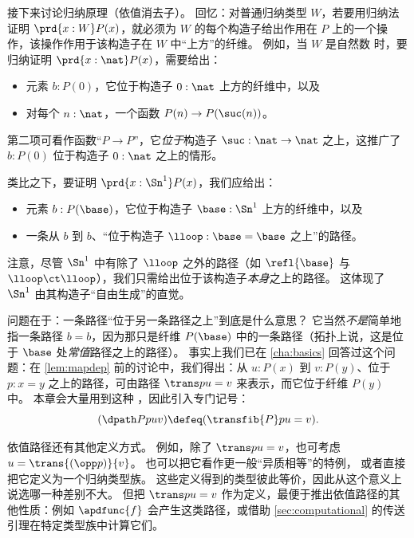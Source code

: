 %
%
接下来讨论归纳原理（依值消去子）。
回忆：对普通归纳类型 $W$，若要用归纳法证明 $\prd{x:W} P(x)$，就必须为 $W$ 的每个构造子给出作用在 $P$ 上的一个操作，该操作作用于该构造子在 $W$ 中“上方”的纤维。
例如，当 $W$ 是自然数 \nat 时，要归纳证明 $\prd{x:\nat} P(x)$，需要给出：
\begin{itemize}
\item 元素 $b:P(0)$，它位于构造子 $0:\nat$ 上方的纤维中，以及
\item 对每个 $n:\nat$，一个函数 $P(n) \to P(\suc(n))$。
\end{itemize}
第二项可看作函数“$P\to P$”，它\emph{位于}构造子 $\suc:\nat\to\nat$ 之上，这推广了 $b:P(0)$ 位于构造子 $0:\nat$ 之上的情形。

类比之下，要证明 $\prd{x:\Sn^1} P(x)$，我们应给出：
\begin{itemize}
\item 元素 $b:P(\base)$，它位于构造子 $\base:\Sn^1$ 上方的纤维中，以及
\item 一条从 $b$ 到 $b$、“位于构造子 $\lloop:\base=\base$ 之上”的路径。
\end{itemize}
注意，尽管 $\Sn^1$ 中有除了 $\lloop$ 之外的路径（如 $\refl{\base}$ 与 $\lloop\ct\lloop$），我们只需给出位于该构造子\emph{本身}之上的路径。
这体现了 $\Sn^1$ 由其构造子“自由生成”的直觉。

问题在于：一条路径“位于另一条路径之上”到底是什么意思？
它当然\emph{不是}简单地指一条路径 $b=b$，因为那只是纤维 $P(\base)$ 中的一条路径（拓扑上说，这是位于 $\base$ 处\emph{常值}路径之上的路径）。
事实上我们已在 \cref{cha:basics} 回答过这个问题：在 \cref{lem:mapdep} 前的讨论中，我们得出：从 $u:P(x)$ 到 $v:P(y)$、位于 $p:x=y$ 之上的路径，可由路径 $\trans p u = v$ 来表示，而它位于纤维 $P(y)$ 中。
本章会大量用到这种
%
，因此引入专门记号：
\begin{equation}
  (\dpath P p u v) \defeq (\transfib{P} p u = v).\label{eq:dpath}
\end{equation}

\begin{rmk}
依值路径还有其他定义方式。
例如，除了 $\trans p u = v$，也可考虑 $u = \trans{(\opp p)}{v}$。
也可以把它看作更一般“异质相等”的特例，
%
%
或者直接把它定义为一个归纳类型族。
这些定义得到的类型彼此等价，因此从这个意义上说选哪一种差别不大。
但把 $\trans p u = v$ 作为定义，最便于推出依值路径的其他性质：例如 $\apdfunc{f}$ 会产生这类路径，或借助 \cref{sec:computational} 的传送引理在特定类型族中计算它们。
\end{rmk}

